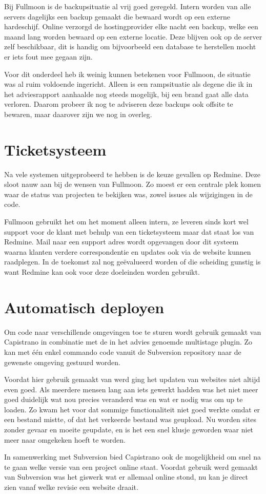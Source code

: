 Bij Fullmoon is de backupsituatie al vrij goed geregeld. Intern worden van alle servers dagelijks een backup gemaakt die bewaard wordt op een externe hardeschijf. Online verzorgd de hostingprovider elke nacht een backup, welke een maand lang worden bewaard op een externe locatie. Deze blijven ook op de server zelf beschikbaar, dit is handig om bijvoorbeeld een database te herstellen mocht er iets fout mee gegaan zijn.

Voor dit onderdeel heb ik weinig kunnen betekenen voor Fullmoon, de situatie was al ruim voldoende ingericht. Alleen is een rampsituatie als degene die ik in het adviesrapport aanhaalde nog steeds mogelijk, bij een brand gaat alle data verloren. Daarom probeer ik nog te adviseren deze backups ook offsite te bewaren, maar daarover zijn we nog in overleg.

\section{Ticketsysteem}

Na vele systemen uitgeprobeerd te hebben is de keuze gevallen op Redmine. Deze sloot nauw aan bij de wensen van Fullmoon. Zo moest er een centrale plek komen waar de status van projecten te bekijken was, zowel issues als wijzigingen in de code.

Fullmoon gebruikt het om het moment alleen intern, ze leveren sinds kort wel support voor de klant met behulp van een ticketsysteem maar dat staat los van Redmine. Mail naar een support adres wordt opgevangen door dit systeem waarna klanten verdere correspondentie en updates ook via de website kunnen raadplegen. In de toekomst zal nog geëvalueerd worden of die scheiding gunstig is want Redmine kan ook voor deze doeleinden worden gebruikt.

\section{Automatisch deployen}

Om code naar verschillende omgevingen toe te sturen wordt gebruik gemaakt van Capistrano in combinatie met de in het advies genoemde multistage plugin. Zo kan met één enkel commando code vanuit de Subversion repository naar de gewenste omgeving gestuurd worden.

Voordat hier gebruik gemaakt van werd ging het updaten van websites niet altijd even goed. Als meerdere mensen lang aan iets gewerkt hadden was het niet meer goed duidelijk wat nou precies veranderd was en wat er nodig was om up te loaden. Zo kwam het voor dat sommige functionaliteit niet goed werkte omdat er een bestand mistte, of dat het verkeerde bestand was geupload. Nu worden sites zonder gevaar en moeite geupdate, en is het een snel klusje geworden waar niet meer naar omgekeken hoeft te worden.

In samenwerking met Subversion bied Capistrano ook de mogelijkheid om snel na te gaan welke versie van een project online staat. Voordat gebruik werd gemaakt van Subversion was het giswerk wat er allemaal online stond, nu kan je direct zien vanaf welke revisie een website draait.
